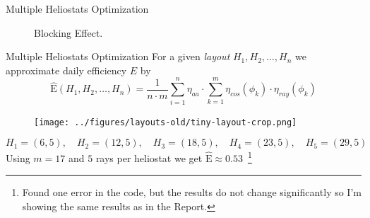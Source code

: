 \documentclass[10pt, xcolor={dvipsnames}]{beamer}
\begin{document}
\begin{frame}{Multiple Heliostats Optimization}
\begin{minipage}[t]{0.5\textwidth}
\begin{center}
\begin{figure}
\caption{Blocking Effect.}
\end{figure}
\end{center}
\end{minipage}
\end{frame}

\begin{frame}{Multiple Heliostats Optimization}
For a given {\it layout} $H_{1}, H_{2}, \dots, H_{n}$ we approximate daily efficiency $E$ by
\begin{equation}
\widehat{\text{E}}(H_{1}, H_{2}, \dots, H_{n}) = 
\frac{1}{n\cdot m}
\sum_{i = 1}^{n} \eta_{aa} \cdot
\sum_{k = 1}^{m} \eta_{cos}(\phi_{k}) \cdot 
\eta_{ray}(\phi_{k})
\end{equation}
\vspace{-.4cm}
\begin{center}
\begin{figure}
\texttt{[image: ../figures/layouts-old/tiny-layout-crop.png]}
\end{figure}
\end{center}
\vspace{-0.4cm}
\begin{example}
$$
H_1 = (6, 5), \quad 
H_2 = (12, 5), \quad
H_3 = (18, 5), \quad
H_4 = (23, 5), \quad
H_5 = (29, 5)
$$
Using $m = 17$ and $5$ rays per heliostat we get $\widehat{\text{E}} \approx 0.53$~\footnote{Found one error in the code, but the results do not change significantly so I'm showing the same results as in the Report.}
\end{example}
\end{frame}
\end{document}
